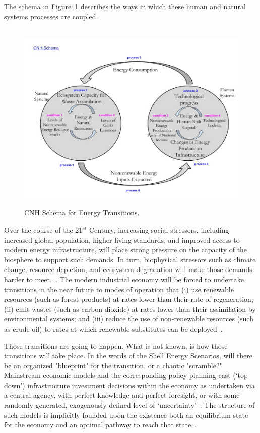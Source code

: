 \documentclass[11pt,a4paper]{article}
\begin{document}
The schema in Figure~\ref{fig:CNH_Schema} describes the ways in which 
these human and natural systems processes are coupled.
\begin{figure}
\centering\
\includegraphics[width=\linewidth]{CNH_Schema.jpg}
\caption[CNH Schema]{CNH Schema for Energy Transitions.}
\label{fig:CNH_Schema}
\end{figure}
Over the course of the 21$^{st}$ Century, 
increasing social stressors, including
increased global population,
 higher living standards, and
improved access to modern energy infrastructure,
will place strong pressure on the capacity of the biosphere
to support such demands. 
In turn, biophysical stressors
such as climate change,
resource depletion, and
ecosystem degradation will make those demands
harder to meet.~\cite{IPCC2014}.
The modern industrial economy will be forced to undertake
transitions in the near future
to modes of operation that
(i) use renewable resources (such as forest products) 
at rates lower than their rate of regeneration;
(ii) emit wastes (such as carbon dioxide) 
at rates lower than their assimilation by environmental systems; and
(iii) reduce the use of non-renewable resources (such as crude oil) 
to rates at which renewable substitutes can be deployed~\cite{Goodland1996, G-R1971}. 

Those transitions are going to happen. What is not known, is how
those transitions will take place. In the words of the Shell Energy Scenarios, will there be an organized "blueprint"
for the transition, or a chaotic "scramble?"~\cite{} Mainstream economic models and the corresponding
policy planning cast (`top-down') infrastructure investment decisions 
within the economy as undertaken via a central agency,
with perfect knowledge and perfect foresight, 
or with some randomly generated, 
exogenously defined level of `uncertainty'~\cite{Hu2010}.
The structure of such models
is implicitly founded upon the existence both 
an equilibrium state for the economy
and an optimal pathway to reach that state~\cite{}.
\end{document}
